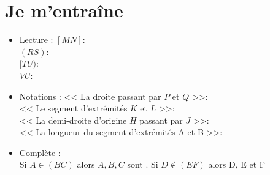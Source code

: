 \section{ Je m'entraîne}
\begin{itemize}
	\item[\textbullet] Lecture : $[MN]$: \trous{9cm}\\
	 $(RS)$: \trous{9cm}\\
	 $[TU)$: \trous{9cm}\\
	 $VU$: \trous{9cm}
	\item[\textbullet] Notations : << La droite passant par $P$ et $Q$ >>: \trous{9cm}\\
	 << Le segment d'extrémités $K$ et $L$ >>: \trous{9cm} \\
	 << La demi-droite d'origine $H$ passant par $J$ >>: \trous{9cm} \\
	 << La longueur du segment d'extrémités A et B >>: \trous{9cm}
	\item[\textbullet] Complète :\\
	Si $A \in (BC)$ alors $A,B,C$ sont \trou{3cm}. Si $D \notin (EF)$ alors D, E et F \trou{5cm}
\end{itemize}
